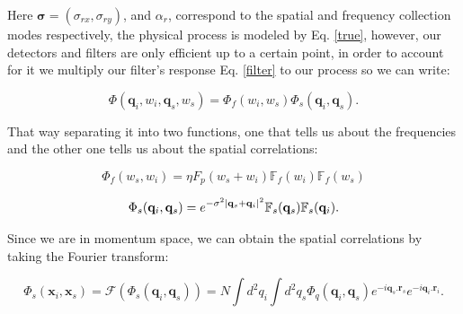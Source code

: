 \documentclass[12pt]{book}
\begin{document}
Here $\mathbf{\sigma}=(\sigma_{rx},\sigma_{ry})$, and $\alpha_{r}$, correspond to the spatial and frequency collection modes respectively, the physical process is modeled by Eq. \ref{true}, however, our detectors and filters are only efficient up to a certain point, in order to account for it we multiply our filter's response Eq. \ref{filter} to our process so we can write:
 
\begin{equation}
\Phi(\mathbf{q}_{i},w_{i},\mathbf{q}_{s},w_{s})=\Phi_{f}(w_{i},w_{s})\Phi_{s}(\mathbf{q}_{i},\mathbf{q}_{s}).
\end{equation}

That way separating it into two functions, one that tells us about the frequencies  and the other one tells us about the spatial correlations:

\begin{equation}
\Phi_{f}(w_{s},w_{i})= \eta F_{p}(w_{s}+w_{i}) \mathbb{F}_{f}(w_{i})\mathbb{F}_{f}(w_{s})
\end{equation}

\begin{equation}
 \Phi_{s}(\mathbf{q}_{i},\mathbf{q}_{s})=e^{-\sigma^{2}\abs{\mathbf{q}_{s}+\mathbf{q}_{i}}^{2}}\mathbb{F}_{s}(\mathbf{q}_{s})\mathbb{F}_{s}(\mathbf{q}_{i}).
\end{equation}

Since we are in momentum space, we can obtain the spatial correlations by taking the Fourier transform:

\begin{equation}
\Phi_{s}(\mathbf{x}_{i},\mathbf{x}_{s})=\mathscr{F}(\Phi_{s}(\mathbf{q}_{i},\mathbf{q}_{s}))=N \int d^{2}q_{i} \int d^{2}q_{s} \Phi_{q}(\mathbf{q}_{i},\mathbf{q}_{s}) e^{-i \mathbf{q}_{s}.\mathbf{r}_{s}} e^{-i \mathbf{q}_{i}.\mathbf{r}_{i}}.
\end{equation}
\end{document}
